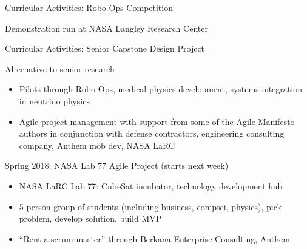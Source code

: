 \documentclass[xcolor={dvipsnames},professionalfonts]{beamer}
\begin{document}
\begin{frame}{Curricular Activities: Robo-Ops Competition}
 \begin{block}{Demonstration run at NASA Langley Research Center}
 \begin{center}
 \end{center}
 \end{block}
\end{frame}

\begin{frame}{Curricular Activities: Senior Capstone Design Project}
 \begin{block}{Alternative to senior research}
 \begin{itemize}
  \item Pilots through Robo-Ops, medical physics development, systems integration in neutrino physics
  \item Agile project management with support from some of the Agile Manifesto authors in conjunction with defense contractors, engineering consulting company, Anthem mob dev, NASA LaRC
 \end{itemize}
 \end{block}
 \begin{block}{Spring 2018: NASA Lab 77 Agile Project (starts next week)}
  \begin{itemize}
   \item NASA LaRC Lab 77: CubeSat incubator, technology development hub
   \item 5-person group of students (including business, compsci, physics), pick problem, develop solution, build MVP
   \item ``Rent a scrum-master'' through Berkana Enterprise Consulting, Anthem
  \end{itemize}
 \end{block}
\end{frame}
\end{document}

